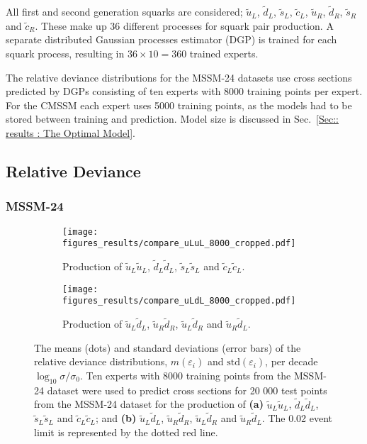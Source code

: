 \documentclass[twoside,english]{uiofysmaster}
\begin{document}
{{All first and second generation squarks are considered; $\widetilde{u}_L$, $\widetilde{d}_L$, $\widetilde{s}_L$, $\widetilde{c}_L$, $\widetilde{u}_R$, $\widetilde{d}_R$, $\widetilde{s}_R$ and $\widetilde{c}_R$. These make up 36 different processes for squark pair production. A separate distributed Gaussian processes estimator (DGP) is trained for each squark process, resulting in $36 \times 10 = 360$ trained experts. 

The relative deviance distributions for the MSSM-24 datasets use cross sections predicted by DGPs consisting of ten experts with 8000 training points per expert. For the CMSSM each expert uses 5000 training points, as the models had to be stored between training and prediction. Model size is discussed in Sec.~\ref{Sec:: results : The Optimal Model}.

\subsection{Relative Deviance}\label{Sec:: results : Relative Deviance}




\subsubsection{MSSM-24}

\begin{figure}
    \centering
    \begin{subfigure}[b]{1\textwidth}
        \texttt{[image: figures\_results/compare\_uLuL\_8000\_cropped.pdf]}
        \caption{Production of $\widetilde{u}_L \widetilde{u}_L$, $\widetilde{d}_L \widetilde{d}_L$, $\widetilde{s}_L \widetilde{s}_L$ and $\widetilde{c}_L \widetilde{c}_L$.}
        \label{Fig:: results : RD MSSM-24 uLuL}
    \end{subfigure}
    \begin{subfigure}[b]{1\textwidth}
        \texttt{[image: figures\_results/compare\_uLdL\_8000\_cropped.pdf]}
        \caption{Production of $\widetilde{u}_L\widetilde{d}_L$, $\widetilde{u}_R\widetilde{d}_R$, $\widetilde{u}_L\widetilde{d}_R$ and $\widetilde{u}_R\widetilde{d}_L$.}
        \label{Fig :: results : RD MSSM-24 uLdL}
    \end{subfigure}
    \caption[Relative deviance distributions for the optimal DGP, MSSM-24]{The means (dots) and standard deviations (error bars) of the relative deviance distributions, $m(\varepsilon_i)$ and $\mathrm{std}(\varepsilon_i)$, per decade $\log_{10} \sigma / \sigma_0$. Ten experts with 8000 training points from the MSSM-24 dataset were used to predict cross sections for 20 000 test points from the MSSM-24 dataset for the production of \textbf{(a)}  $\widetilde{u}_L \widetilde{u}_L$, $\widetilde{d}_L \widetilde{d}_L$, $\widetilde{s}_L \widetilde{s}_L$ and $\widetilde{c}_L \widetilde{c}_L$; and \textbf{(b)} $\widetilde{u}_L\widetilde{d}_L$, $\widetilde{u}_R\widetilde{d}_R$, $\widetilde{u}_L\widetilde{d}_R$ and $\widetilde{u}_R\widetilde{d}_L$. The 0.02 event limit is represented by the dotted red line.}
\label{Fig:: results : RD MSSM-24}
\end{figure}

}}
\end{document}
